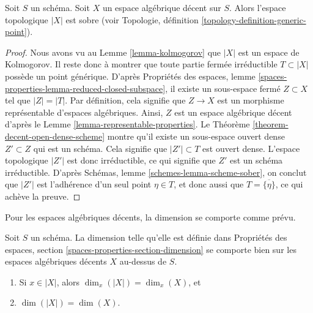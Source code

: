 \begin{proposition}
\label{proposition-reasonable-sober}
Soit $S$ un schéma. Soit $X$ un espace algébrique décent sur $S$.
Alors l'espace topologique $|X|$ est sobre (voir
Topologie, définition \ref{topology-definition-generic-point}).
\end{proposition}

\begin{proof}
Nous avons vu au Lemme \ref{lemma-kolmogorov} que $|X|$ est un espace de
Kolmogorov. Il reste donc à montrer que toute partie fermée irréductible
$T \subset |X|$ possède un point générique. D'après
Propriétés des espaces,
lemme \ref{spaces-properties-lemma-reduced-closed-subspace},
il existe un sous-espace fermé $Z \subset X$ tel que $|Z| = |T|$.
Par définition, cela signifie que $Z \to X$ est un morphisme représentable
d'espaces algébriques. Ainsi, $Z$ est un espace algébrique décent
d'après le Lemme \ref{lemma-representable-properties}. Le
Théorème \ref{theorem-decent-open-dense-scheme}
montre qu'il existe un sous-espace ouvert dense $Z' \subset Z$ qui est un
schéma. Cela signifie que $|Z'| \subset T$ est ouvert dense.
L'espace topologique $|Z'|$ est donc irréductible, ce qui signifie que
$Z'$ est un schéma irréductible. D'après
Schémas, lemme \ref{schemes-lemma-scheme-sober},
on conclut que $|Z'|$ est l'adhérence d'un seul point $\eta \in T$,
et donc aussi que $T = \overline{\{\eta\}}$, ce qui achève la preuve.
\end{proof}

\noindent
Pour les espaces algébriques décents, la dimension se comporte comme prévu.

\begin{lemma}
\label{lemma-dimension-decent-space}
Soit $S$ un schéma. La dimension telle qu'elle est définie dans
Propriétés des espaces, section \ref{spaces-properties-section-dimension}
se comporte bien sur les espaces algébriques décents $X$ au-dessus de $S$.
\begin{enumerate}
\item Si $x \in |X|$, alors $\dim_x(|X|) = \dim_x(X)$, et
\item $\dim(|X|) = \dim(X)$.
\end{enumerate}
\end{lemma}

